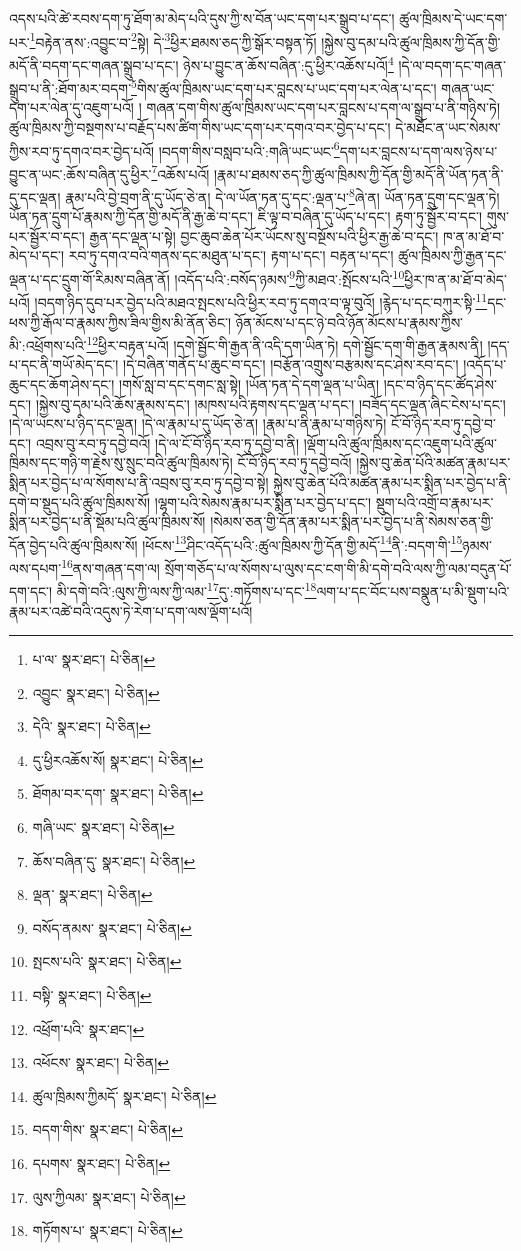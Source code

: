 འདས་པའི་ཚེ་རབས་དག་ཏུ་ཐོག་མ་མེད་པའི་དུས་ཀྱི་ས་བོན་ཡང་དག་པར་སྒྲུབ་པ་དང་། ཚུལ་ཁྲིམས་དེ་ཡང་དག་པར་\footnote{པ་ལ་  སྣར་ཐང་།  པེ་ཅིན། }བརྟེན་ནས་:འབྱུང་བ་\footnote{འབྱུང་  སྣར་ཐང་།  པེ་ཅིན། }སྟེ། དེ་\footnote{དེའི་  སྣར་ཐང་།  པེ་ཅིན། }ཕྱིར་ཐམས་ཅད་ཀྱི་སྒོར་བསྟན་ཏོ། །སྐྱེས་བུ་དམ་པའི་ཚུལ་ཁྲིམས་ཀྱི་དོན་གྱི་མདོ་ནི་བདག་དང་གཞན་སྒྲུབ་པ་དང་། ཉེས་པ་བྱུང་ན་ཆོས་བཞིན་:དུ་ཕྱིར་འཆོས་པའོ།\footnote{དུ་ཕྱིརའཆོས་སོ།  སྣར་ཐང་།  པེ་ཅིན། } །དེ་ལ་བདག་དང་གཞན་སྒྲུབ་པ་ནི་:ཐོག་མར་བདག་\footnote{ཐོགམ་བར་དག་  སྣར་ཐང་།  པེ་ཅིན། }གིས་ཚུལ་ཁྲིམས་ཡང་དག་པར་བླངས་པ་ཡང་དག་པར་ལེན་པ་དང་། གཞན་ཡང་དག་པར་ལེན་དུ་འཇུག་པའོ། །
གཞན་དག་གིས་ཚུལ་ཁྲིམས་ཡང་དག་པར་བླངས་པ་དག་ལ་སྒྲུབ་པ་ནི་གཉིས་ཏེ། ཚུལ་ཁྲིམས་ཀྱི་བསྔགས་པ་བརྗོད་པས་ཚིག་གིས་ཡང་དག་པར་དགའ་བར་བྱེད་པ་དང་། དེ་མཐོང་ན་ཡང་སེམས་ཀྱིས་རབ་ཏུ་དགའ་བར་བྱེད་པའོ། །བདག་གིས་བསླབ་པའི་:གཞི་ཡང་ཡང་\footnote{གཞི་ཡང་  སྣར་ཐང་།  པེ་ཅིན། }དག་པར་བླངས་པ་དག་ལས་ཉེས་པ་བྱུང་ན་ཡང་:ཆོས་བཞིན་དུ་ཕྱིར་\footnote{ཆོས་བཞིན་དུ་  སྣར་ཐང་།  པེ་ཅིན། }འཆོས་པའོ། །རྣམ་པ་ཐམས་ཅད་ཀྱི་ཚུལ་ཁྲིམས་ཀྱི་དོན་གྱི་མདོ་ནི་ཡོན་ཏན་ནི་དུ་དང་ལྡན། རྣམ་པའི་བྱེ་བྲག་ནི་དུ་ཡོད་ཅེ་ན། དེ་ལ་ཡོན་ཏན་དུ་དང་:ལྡན་པ་\footnote{ལྡན་  སྣར་ཐང་།  པེ་ཅིན། }ཞེ་ན། ཡོན་ཏན་དྲུག་དང་ལྡན་ཏེ། ཡོན་ཏན་དྲུག་པོ་རྣམས་ཀྱི་དོན་གྱི་མདོ་ནི་རྒྱ་ཆེ་བ་དང་། ཇི་ལྟ་བ་བཞིན་དུ་ཡོད་པ་དང་། རྟག་ཏུ་སྦྱོར་བ་དང་། གུས་པར་སྦྱོར་བ་དང་། རྒྱན་དང་ལྡན་པ་སྟེ། བྱང་ཆུབ་ཆེན་པོར་ཡོངས་སུ་བསྔོས་པའི་ཕྱིར་རྒྱ་ཆེ་བ་དང་། ཁ་ན་མ་ཐོ་བ་མེད་པ་དང་། རབ་ཏུ་དགའ་བའི་གནས་དང་མཐུན་པ་དང་། རྟག་པ་དང་། བརྟན་པ་དང་། ཚུལ་ཁྲིམས་ཀྱི་རྒྱན་དང་ལྡན་པ་དང་དྲུག་གོ་རིམས་བཞིན་ནོ། །འདོད་པའི་:བསོད་ཉམས་\footnote{བསོད་ནམས་  སྣར་ཐང་།  པེ་ཅིན། }ཀྱི་མཐའ་:སྤོངས་པའི་\footnote{སྤངས་པའི་  སྣར་ཐང་།  པེ་ཅིན། }ཕྱིར་ཁ་ན་མ་ཐོ་བ་མེད་པའོ། །བདག་ཉིད་དུབ་པར་བྱེད་པའི་མཐའ་སྤངས་པའི་ཕྱིར་རབ་ཏུ་དགའ་བ་ལྟ་བུའོ། །རྙེད་པ་དང་བཀུར་སྟི་\footnote{བསྟི་  སྣར་ཐང་།  པེ་ཅིན། }དང་ཕས་ཀྱི་རྒོལ་བ་རྣམས་ཀྱིས་ཟིལ་གྱིས་མི་ནོན་ཅིང་། ཉོན་མོངས་པ་དང་ཉེ་བའི་ཉོན་མོངས་པ་རྣམས་ཀྱིས་མི་:འཕྲོགས་པའི་\footnote{འཕྲོག་པའི་  སྣར་ཐང་། }ཕྱིར་བརྟན་པའོ། །དགེ་སྦྱོང་གི་རྒྱན་ནི་འདི་དག་ཡིན་ཏེ། དགེ་སྦྱོང་དག་གི་རྒྱན་རྣམས་ནི། །དད་པ་དང་ནི་གཡོ་མེད་དང་། །དེ་བཞིན་གནོད་པ་ཆུང་བ་དང་། །བརྩོན་འགྲུས་བརྩམས་དང་ཤེས་རབ་དང་། །འདོད་པ་ཆུང་དང་ཆོག་ཤེས་དང་། །གསོ་སླ་བ་དང་དགང་སླ་སྟེ། །ཡོན་ཏན་དེ་དག་ལྡན་པ་ཡིན། །དང་བ་ཉིད་དང་ཚོད་ཤེས་དང་། །སྐྱེས་བུ་དམ་པའི་ཆོས་རྣམས་དང་། །མཁས་པའི་རྟགས་དང་ལྡན་པ་དང་། །བཟོད་དང་ལྡན་ཞིང་ངེས་པ་དང་། །དེ་ལ་ཡངས་པ་ཉིད་དང་ལྡན། །དེ་ལ་རྣམ་པ་དུ་ཡོད་ཅེ་ན། །རྣམ་པ་ནི་རྣམ་པ་གཉིས་ཏེ། ངོ་བོ་ཉིད་རབ་ཏུ་དབྱེ་བ་དང་། འབྲས་བུ་རབ་ཏུ་དབྱེ་བའོ། །དེ་ལ་ངོ་བོ་ཉིད་རབ་ཏུ་དབྱེ་བ་ནི། །ལྡོག་པའི་ཚུལ་ཁྲིམས་དང་འཇུག་པའི་ཚུལ་ཁྲིམས་དང་གཉི་ག་རྗེས་སུ་སྲུང་བའི་ཚུལ་ཁྲིམས་ཏེ། ངོ་བོ་ཉིད་རབ་ཏུ་དབྱེ་བའོ། །སྐྱེས་བུ་ཆེན་པོའི་མཚན་རྣམ་པར་སྨིན་པར་བྱེད་པ་ལ་སོགས་པ་ནི་འབྲས་བུ་རབ་ཏུ་དབྱེ་བ་སྟེ། སྐྱེས་བུ་ཆེན་པོའི་མཚན་རྣམ་པར་སྨིན་པར་བྱེད་པ་ནི་དགེ་བ་སྡུད་པའི་ཚུལ་ཁྲིམས་སོ། །ལྷག་པའི་སེམས་རྣམ་པར་སྨིན་པར་བྱེད་པ་དང་། སྡུག་པའི་འགྲོ་བ་རྣམ་པར་སྨིན་པར་བྱེད་པ་ནི་སྡོམ་པའི་ཚུལ་ཁྲིམས་སོ། །སེམས་ཅན་གྱི་དོན་རྣམ་པར་སྨིན་པར་བྱེད་པ་ནི་སེམས་ཅན་གྱི་དོན་བྱེད་པའི་ཚུལ་ཁྲིམས་སོ། །ཕོངས་\footnote{འཕོངས་  སྣར་ཐང་།  པེ་ཅིན། }ཤིང་འདོད་པའི་:ཚུལ་ཁྲིམས་ཀྱི་དོན་གྱི་མདོ་\footnote{ཚུལ་ཁྲིམས་ཀྱིམདོ་  སྣར་ཐང་།  པེ་ཅིན། }ནི་:བདག་གི་\footnote{བདག་གིས་  སྣར་ཐང་།  པེ་ཅིན། }ཉམས་ལས་དཔག་\footnote{དཔགས་  སྣར་ཐང་།  པེ་ཅིན། }ནས་གཞན་དག་ལ། སྲོག་གཅོད་པ་ལ་སོགས་པ་ལུས་དང་ངག་གི་མི་དགེ་བའི་ལས་ཀྱི་ལམ་བདུན་པོ་དག་དང་། མི་དགེ་བའི་:ལུས་ཀྱི་ལས་ཀྱི་ལམ་\footnote{ལུས་ཀྱིལམ་  སྣར་ཐང་།  པེ་ཅིན། }དུ་:གཏོགས་པ་དང་\footnote{གཏོགས་པ་  སྣར་ཐང་།  པེ་ཅིན། }ལག་པ་དང་བོང་པས་བསྣུན་པ་མི་སྡུག་པའི་རྣམ་པར་འཚེ་བའི་འདུས་ཏེ་རེག་པ་དག་ལས་ལྡོག་པའོ། 